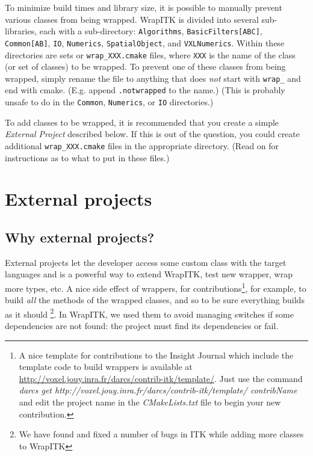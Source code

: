 \documentclass{InsightArticle}
\begin{document}
To minimize build times and library size, it is possible to manually prevent
various classes from being wrapped. WrapITK is divided into several
sub-libraries, each with a sub-directory: \verb$Algorithms$, \verb$BasicFilters[ABC]$,
\verb$Common[AB]$, \verb$IO$, \verb$Numerics$, \verb$SpatialObject$, and \verb$VXLNumerics$. Within these
directories are sets or \verb$wrap_XXX.cmake$ files, where \verb$XXX$ is the name of the class
(or set of classes) to be wrapped. To prevent one of these classes from being
wrapped, simply rename the file to anything that does {\em not} start with \verb$wrap_$ and
end with cmake. (E.g. append \verb$.notwrapped$ to the name.) (This is probably
unsafe to do in the \verb$Common$, \verb$Numerics$, or \verb$IO$ directories.)

To add classes to be wrapped, it is recommended that you create a simple
{\em External Project} described below. If this is out of the question, you could
create additional \verb$wrap_XXX.cmake$ files in the appropriate directory. (Read on
for instructions as to what to put in these files.)


  \section{External projects}

    \subsection{Why external projects?}

External projects let the developer access some custom class with the target languages
and is a powerful way to extend WrapITK, test new wrapper, wrap more types, etc.
A nice side effect of wrappers, for contributions\footnote{A nice template for
contributions to the Insight Journal \cite{InsightJournalWebSite} which include the
template code to build wrappers is available at
\url{http://voxel.jouy.inra.fr/darcs/contrib-itk/template/}. Just use the command
{\em darcs get http://voxel.jouy.inra.fr/darcs/contrib-itk/template/ contribName}
and edit the project name in the {\em CMakeLists.txt} file to
begin your new contribution.}, for example, to build {\em all}
the methods of the wrapped classes, and so to be sure everything builds as it should
\footnote{We have found and fixed  a number of bugs in ITK while adding
more classes to WrapITK}.
In WrapITK, we used them to avoid managing switches if some dependencies are not
found: the project must find its dependencies or fail.
\end{document}
